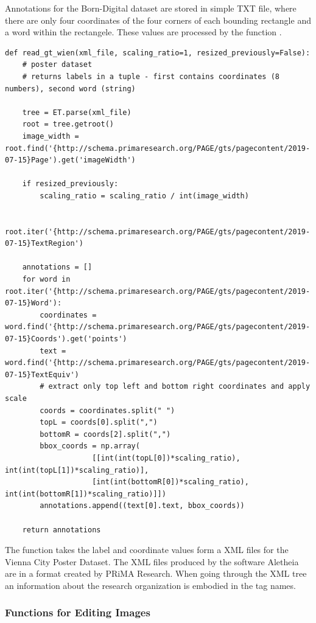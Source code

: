 Annotations for the Born-Digital dataset are stored in simple TXT file, where there are only four coordinates of the four corners of each bounding rectangle and a word within the rectangele. These values are processed by the function .

\begin{lstlisting}[caption=read\_gt\_wien]
def read_gt_wien(xml_file, scaling_ratio=1, resized_previously=False):
    # poster dataset
    # returns labels in a tuple - first contains coordinates (8 numbers), second word (string)

    tree = ET.parse(xml_file)
    root = tree.getroot()
    image_width = root.find('{http://schema.primaresearch.org/PAGE/gts/pagecontent/2019-07-15}Page').get('imageWidth')

    if resized_previously:
        scaling_ratio = scaling_ratio / int(image_width)

    root.iter('{http://schema.primaresearch.org/PAGE/gts/pagecontent/2019-07-15}TextRegion')

    annotations = []
    for word in root.iter('{http://schema.primaresearch.org/PAGE/gts/pagecontent/2019-07-15}Word'):
        coordinates = word.find('{http://schema.primaresearch.org/PAGE/gts/pagecontent/2019-07-15}Coords').get('points')
        text = word.find('{http://schema.primaresearch.org/PAGE/gts/pagecontent/2019-07-15}TextEquiv')
        # extract only top left and bottom right coordinates and apply scale
        coords = coordinates.split(" ")
        topL = coords[0].split(",")
        bottomR = coords[2].split(",")
        bbox_coords = np.array(
                    [[int(int(topL[0])*scaling_ratio), int(int(topL[1])*scaling_ratio)], 
                    [int(int(bottomR[0])*scaling_ratio), int(int(bottomR[1])*scaling_ratio)]])
        annotations.append((text[0].text, bbox_coords))

    return annotations
\end{lstlisting}

The function  takes the label and coordinate values form a XML files for the Vienna City Poster Dataset. The XML files produced by the software Aletheia are in a format created by PRiMA Research. When going through the XML tree an information about the research organization is embodied in the tag names.

\subsubsection*{Functions for Editing Images}

